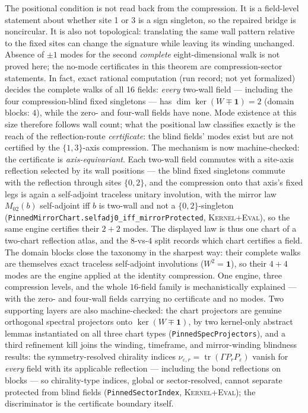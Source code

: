 \documentclass[11pt]{article}
\newcommand{\id}{\mathbf{1}}
\newcommand{\DraftTrust}{\textcolor{draftcolor}{\textsc{Kernel+Eval}}}
\begin{document}
The positional condition is not read back from the compression.  It is a
field-level statement about whether site 1 or 3 is a sign singleton, so the
repaired bridge is noncircular.  It is also not topological: translating the
same wall pattern relative to the fixed sites can change the signature while
leaving its winding unchanged.  Absence of $\pm1$ modes for the second
\emph{complete} eight-dimensional walk is not proved here; the no-mode
certificates in this theorem are compression-sector statements.  In fact,
exact rational computation (run record; not yet formalized) decides the
complete walks of all 16 fields: \emph{every} two-wall field --- including
the four compression-blind fixed singletons --- has
$\dim\ker(W\mp\id)=2$ (domain blocks: $4$), while the zero- and four-wall
fields have none.  Mode existence at this size therefore follows wall
count; what the positional law classifies exactly is the reach of the
reflection-route \emph{certificate}: the blind fields' modes exist but are
not certified by the $\{1,3\}$-axis compression.  The mechanism is now
machine-checked: the certificate is \emph{axis-equivariant}.  Each
two-wall field commutes with a site-axis reflection selected by its wall
positions --- the blind fixed singletons commute with the reflection
through sites $\{0,2\}$, and the compression onto that axis's fixed legs
is again a self-adjoint traceless unitary involution, with the mirror law
$M_{02}(b)$ self-adjoint iff $b$ is two-wall and not a $\{0,2\}$-singleton
(\texttt{PinnedMirrorChart.selfadj0\_iff\_mirrorProtected},
\DraftTrust{}), so the same engine certifies their $2+2$ modes.  The
displayed law is thus one chart of a two-chart reflection atlas, and the
$8$-vs-$4$ split records which chart certifies a field.  The domain
blocks close the taxonomy in the sharpest way: their complete walks are
themselves exact traceless self-adjoint involutions ($W^2=\id$), so their
$4+4$ modes are the engine applied at the identity compression.  One
engine, three compression levels, and the whole $16$-field family is
mechanistically explained --- with the zero- and four-wall fields
carrying no certificate and no modes.  Two supporting layers are also
machine-checked: the chart projectors are genuine orthogonal spectral
projectors onto $\ker(W\mp\id)$, by two kernel-only abstract lemmas
instantiated on all three chart types
(\texttt{PinnedSpecProjectors}), and a third refinement kill joins the
winding, timeframe, and mirror-winding blindness results: the
symmetry-resolved chirality indices
$\nu_{\varepsilon,r}=\operatorname{tr}(\Gamma P_r P_\varepsilon)$ vanish
for \emph{every} field with its applicable reflection --- including the
bond reflections on blocks --- so chirality-type indices, global or
sector-resolved, cannot separate protected from blind fields
(\texttt{PinnedSectorIndex}, \DraftTrust{}); the discriminator is the
certificate boundary itself.
\end{document}
